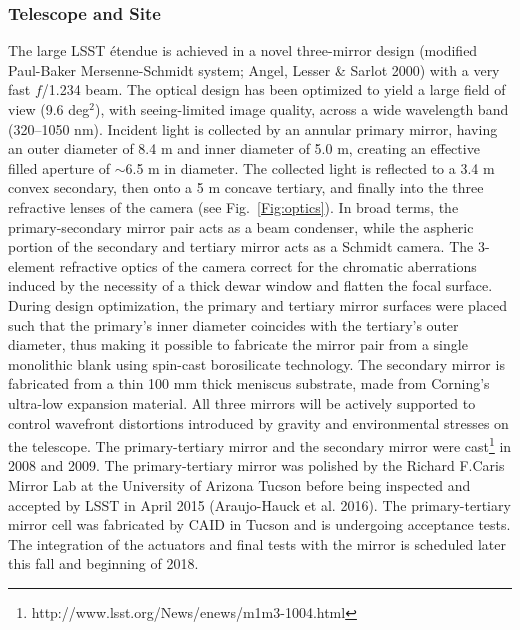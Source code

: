 \subsubsection{ Telescope and Site}

The large LSST \'etendue is achieved in a novel three-mirror design (modified
Paul-Baker Mersenne-Schmidt system; Angel, Lesser \& Sarlot 2000) with a very fast $f$/1.234 beam. The optical 
design has been optimized to yield a large field of view (9.6 deg$^2$), 
with seeing-limited image quality, across a wide wavelength band (320--1050
nm). Incident light is collected by an annular primary mirror, having
an outer diameter of 8.4 m and inner diameter of 5.0 m, creating an effective filled aperture of 
$\sim$6.5 m in diameter. The collected light is reflected to a 3.4 m convex secondary, then onto
a 5 m concave tertiary, and finally  into the three refractive lenses of the camera (see Fig.~\ref{Fig:optics}).  
In broad terms, the primary-secondary mirror pair acts as a beam condenser, while the aspheric portion of 
the secondary and tertiary mirror acts as a Schmidt camera.  The 3-element refractive optics of the camera
correct for the chromatic aberrations induced by the necessity of a thick dewar window and flatten the
focal surface.  During design optimization, the primary and tertiary mirror surfaces were placed such that the primary's 
inner diameter coincides with the tertiary's outer diameter, thus making it possible to fabricate the mirror pair from a 
single monolithic blank using spin-cast borosilicate technology. The secondary mirror is fabricated from 
a thin 100 mm thick meniscus substrate, made from Corning's ultra-low expansion material. All 
three mirrors will be actively supported to control wavefront distortions 
introduced by gravity and environmental stresses on the telescope. 
The primary-tertiary mirror and the secondary mirror were 
cast\footnote{http://www.lsst.org/News/enews/m1m3-1004.html}  in 2008
and 2009.  The primary-tertiary mirror was polished by the Richard F.Caris Mirror Lab at the University of Arizona Tucson before being inspected and accepted by LSST in April 2015 (Araujo-Hauck et al. 2016). The  primary-tertiary mirror cell was fabricated by CAID in Tucson and is undergoing acceptance tests. The integration of the actuators and final tests with the mirror is scheduled later this fall and beginning of 2018. 
 

